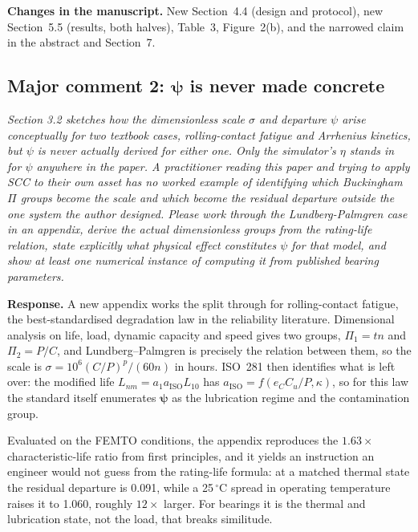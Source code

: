 \documentclass[11pt,a4paper]{article}
\newenvironment{comment}
  {\begin{list}{}{\leftmargin=6mm \rightmargin=2mm}\item[]\color{quoteline}\itshape}
  {\end{list}}
\newcommand{\where}[1]{\textbf{Changes in the manuscript.} #1}
\begin{document}
\where{New Section~4.4 (design and protocol), new Section~5.5 (results, both halves), Table~3,
Figure~2(b), and the narrowed claim in the abstract and Section~7.}

\subsection*{Major comment 2: $\boldsymbol\psi$ is never made concrete}
\begin{comment}
Section 3.2 sketches how the dimensionless scale $\sigma$ and departure $\psi$ arise conceptually
for two textbook cases, rolling-contact fatigue and Arrhenius kinetics, but $\psi$ is never
actually derived for either one. Only the simulator's $\eta$ stands in for $\psi$ anywhere in the
paper. A practitioner reading this paper and trying to apply SCC to their own asset has no worked
example of identifying which Buckingham $\Pi$ groups become the scale and which become the residual
departure outside the one system the author designed. Please work through the Lundberg-Palmgren
case in an appendix, derive the actual dimensionless groups from the rating-life relation, state
explicitly what physical effect constitutes $\psi$ for that model, and show at least one numerical
instance of computing it from published bearing parameters.
\end{comment}

\noindent\textbf{Response.} A new appendix works the split through for rolling-contact fatigue,
the best-standardised degradation law in the reliability literature. Dimensional analysis on life,
load, dynamic capacity and speed gives two groups, $\Pi_1=tn$ and $\Pi_2=P/C$, and
Lundberg--Palmgren is precisely the relation between them, so the scale is
$\sigma=10^{6}(C/P)^{p}/(60n)$ in hours. ISO~281 then identifies what is left over: the modified
life $L_{nm}=a_1a_{\mathrm{ISO}}L_{10}$ has $a_{\mathrm{ISO}}=f(e_CC_u/P,\kappa)$, so for this law
the standard itself enumerates $\boldsymbol\psi$ as the lubrication regime and the contamination
group.

Evaluated on the FEMTO conditions, the appendix reproduces the $1.63\times$ characteristic-life
ratio from first principles, and it yields an instruction an engineer would not guess from the
rating-life formula: at a matched thermal state the residual departure is 0.091, while a
25\,$^\circ$C spread in operating temperature raises it to 1.060, roughly $12\times$ larger. For
bearings it is the thermal and lubrication state, not the load, that breaks similitude.
\end{document}
